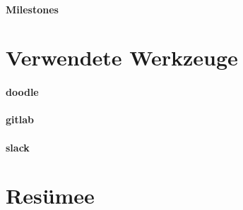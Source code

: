 \paragraph{Milestones}
\section{Verwendete Werkzeuge}
\paragraph{doodle}
\paragraph{gitlab}
\paragraph{slack}
\section{Resümee}



